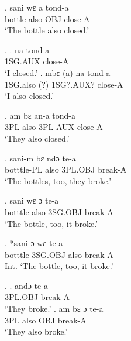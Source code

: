 \documentclass{assets/fieldnotes}
\begin{document}
\exg.
sani     wɛ     a     tond-a  \\
bottle   also   OBJ   close-A \\%
`The bottle also closed.' \label{The bottle also closed}




\ex.
\ag.
na        tond-a  \\
1SG.AUX   close-A \\%
`I closed.'
\bg.
mbɛ        (a)   na          tond-a  \\
1SG.also   (?)   1SG?.AUX?   close-A \\%
`I also closed.' \label{I also closed}



\exg.
am    bɛ     an-a      tond-a  \\
3PL   also   3PL-AUX   close-A \\%
`They also closed.' \label{They also closed}

\exg.
sani-m       bɛ     ndɔ       te-a    \\
botttle-PL   also   3PL.OBJ   break-A \\%
`The bottles, too, they broke.'

\exg.
sani      wɛ     ɔ         te-a    \\
botttle   also   3SG.OBJ   break-A \\%
`The bottle, too, it broke.'

\exg.
*sani     ɔ         wɛ     te-a    \\
botttle   3SG.OBJ   also   break-A \\%
Int. `The bottle, too, it broke.'

\ex.
\ag.
andɔ      te-a    \\
3PL.OBJ   break-A \\%
`They broke.' \label{They broke}
\bg.
am    bɛ     ɔ     te-a    \\
3PL   also   OBJ   break-A \\%
`They also broke.' \label{They also broke}
\end{document}
